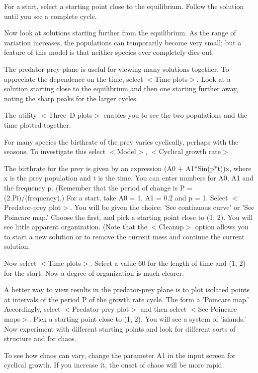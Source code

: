    For a start, select a starting point close to the equilibrium. Follow
the solution until you see a complete cycle.

   Now look at solutions starting further from the equilibrium. As the
range of variation increases, the populations can temporarily become
very small; but a feature of this model is that neither species ever
completely dies out.

   The predator-prey plane is useful for viewing many solutions together.
To appreciate the dependence on the time, select $<$Time plots$>$. Look at
a solution starting close to the equilibrium and then one starting further
away, noting the sharp peaks for the larger cycles.

   The utility $<$Three--D plots$>$ enables you to see the two populations
and the time plotted together.

   For many species the birthrate of the prey varies cyclically, perhaps
with the seasons. To investigate this select $<$Model$>$, $<$Cyclical growth rate$>$.

   The birthrate for the prey is given by an expression
              (A0 + A1$*$Sin(p$*$t))x,
where x is the prey population and t is the time. You can enter numbers
for A0, A1 and the frequency p. (Remember that the period of change is
P = (2.Pi)/(frequency).) For a start, take A0 = 1, A1 = 0.2 and p = 1.
Select $<$Predator-prey plot$>$. You will be given the choice: 'See continuous
curve' or 'See Poincare map.' Choose the first, and pick a starting point
close to (1, 2). You will see little apparent organization. (Note that
the $<$Cleanup$>$ option allows you to start a new solution or to remove the
current mess and continue the current solution.

   Now select $<$Time plots$>$. Select a value 60 for the length of time
and (1, 2) for the start. Now a degree of organization is much clearer.

   A better way to view results in the predator-prey plane is to plot
isolated points at intervals of the period P of the growth rate cycle.
The form a 'Poincare map.' Accordingly, select $<$Predator-prey plot$>$ and
then select $<$See Poincare maps$>$. Pick a starting point close to (1, 2).
You will see a system of 'islands.' Now experiment with different
starting points and look for different sorts of structure and for chaos.

   To see how chaos can vary, change the parameter A1 in the input screen
for cyclical growth. If you increase it, the onset of chaos will be more
rapid.


